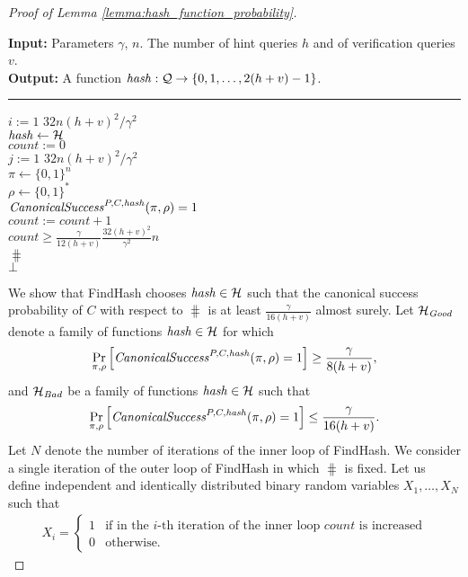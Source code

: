 \begin{proof}[Proof of Lemma \ref{lemma:hash_function_probability}]
\begin{codeblock}
  \textbf{Input:} Parameters $\gamma$, $n$. The number of hint queries $h$ and of verification queries $v$. \\
  \textbf{Output:} A function $\operatorname{\mathit{hash}}:\mathcal{Q} \rightarrow \{0,1, \dots, 2(h+v)-1 \}$.
  \medskip\hrule
  \For $i := 1$ \To $32n(h+v)^2/\gamma^2$ \Do \\
  \IndI $\operatorname{\mathit{hash}} \leftarrow{} \mathcal{H}$ \\
  \IndI $\mathit{count} := 0$ \\
  \IndI \For $j := 1$ \To $32n(h+v)^2/\gamma^2$ \Do \\
  \IndII $\pi \leftarrow \{0,1\}^{n} $\\
  \IndII $\rho \leftarrow \{0,1\}^*$ \\
  \IndII \If $\operatorname{\mathit{CanonicalSuccess}}^{P, C, \operatorname{\mathit{hash}}}(\pi, \rho) = 1$ \Then \\
  \IndIII $\mathit{count} := \mathit{count} + 1$\\
  \IndI \If $\mathit{count} \geq \frac{\gamma}{12(h+v)} \frac{32(h+v)^2}{\gamma^2}n$ \Then \\
  \IndII \Return $\hash$\\
  \Return $\bot$
\end{codeblock}
We show that FindHash chooses $\operatorname{\mathit{hash}} \in \mathcal{H}$ such that the canonical success probability of $C$
with respect to $\hash$ is at least $\frac{\gamma}{16(h+v)}$ almost surely.
Let $\mathcal{H}_{\operatorname{\mathit{Good}}}$ denote a family of functions $\operatorname{\mathit{hash}} \in \mathcal{H}$ for which
\begin{align}
  \label{eq:hash_good}
\underset{\pi, \rho}{\Pr}\left[\operatorname{\mathit{CanonicalSuccess}}^{P, C, \operatorname{\mathit{hash}}}(\pi, \rho) = 1\right] \geq \frac{\gamma}{8(h+v)},
\end{align}
and $\mathcal{H}_{\mathit{Bad}}$ be a family of functions $\operatorname{\mathit{hash}} \in \mathcal{H}$ such that
\begin{align}
  \label{eq:hash_bad}
  \underset{\pi, \rho}{\Pr}\left[\operatorname{\mathit{CanonicalSuccess}}^{P, C, \operatorname{\mathit{hash}}}(\pi, \rho) = 1\right] \leq \frac{\gamma}{16(h+v)}.
\end{align}
Let $N$ denote the number of iterations of the inner loop of FindHash.
We consider a single iteration of the outer loop of FindHash in which $\hash$ is fixed.
Let us define independent and identically distributed binary random variables $X_1, \dots, X_{N}$ such that
\begin{align*}
  X_i =
  \begin{cases}
    1 & \text{if in the $i$-th iteration of the inner loop $\mathit{count}$ is increased}\\
    0 & \text{otherwise.}
  \end{cases}

\end{align*}
\end{proof}
